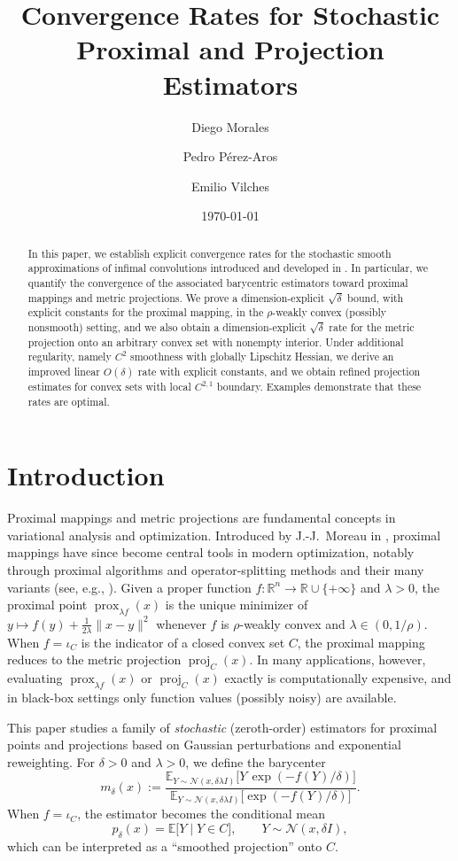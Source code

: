 \documentclass[11pt]{amsart}
\title[Rates for Stochastic Proximal and Projection Estimators]{Convergence Rates for Stochastic Proximal and Projection Estimators}
\author{Diego Morales}
\author{Pedro P\'erez-Aros}
\author{Emilio Vilches}
\date{\today}
\newcommand{\1}{\mathds{1}}
\theoremstyle{definition}
\theoremstyle{remark}
\theoremstyle{definition}
\newcommand{\R}{\mathbb{R}}
\newcommand{\E}{\mathbb{E}}
\newcommand{\proj}{\operatorname{proj}}
\newcommand{\prox}{\operatorname{prox}}
\begin{document}
\begin{abstract}
In this paper, we establish explicit convergence rates for the stochastic smooth approximations of infimal convolutions introduced and developed in \cite{MR4581306,MR4923371}. In particular, we quantify the convergence of the associated barycentric estimators toward proximal mappings and metric projections. We prove a dimension-explicit $\sqrt{\delta}$ bound, with explicit constants for the proximal mapping, in the $\rho$-weakly convex (possibly nonsmooth) setting, and we also obtain a dimension-explicit $\sqrt{\delta}$ rate for the metric projection onto an arbitrary convex set with nonempty interior. Under additional regularity, namely $C^{2}$ smoothness with globally Lipschitz Hessian, we derive an improved linear $O(\delta)$ rate with explicit constants, and we obtain refined projection estimates for convex sets with local $C^{2,1}$ boundary. Examples demonstrate that these rates are optimal.
\end{abstract}

\maketitle

\section{Introduction}

Proximal mappings and metric projections are fundamental concepts in variational analysis and optimization. Introduced by J.-J.~Moreau in \cite{MR201952}, proximal mappings have since become central tools in modern optimization, notably through proximal algorithms and operator-splitting methods and their many variants (see, e.g., \cite{MR3616647}). Given a proper function \(f:\R^n\to\R\cup \{+\infty\}\) and \(\lambda>0\), the proximal point \(\prox_{\lambda f}(x)\) is the unique minimizer
of \(y\mapsto f(y)+\frac{1}{2\lambda}\|x-y\|^2\) whenever \(f\) is \(\rho\)-weakly convex and \(\lambda\in(0,1/\rho)\).
When \(f=\iota_C\) is the indicator of a closed convex set \(C\), the proximal mapping reduces to the metric projection
\(\proj_C(x)\). In many applications, however, evaluating \(\prox_{\lambda f}(x)\) or \(\proj_C(x)\) exactly is computationally
expensive, and in black-box settings only function values (possibly noisy) are available.

This paper studies a family of \emph{stochastic} (zeroth-order) estimators for proximal points and projections based on
Gaussian perturbations and exponential reweighting. For \(\delta>0\) and $\lambda>0$, we define the barycenter
\begin{equation}\label{eq:intro_mdelta}
m_\delta(x)
:=\frac{\E_{Y\sim\mathcal{N}(x,\delta\lambda I)}\!\big[Y\,\exp(-f(Y)/\delta)\big]}
{\E_{Y\sim\mathcal{N}(x,\delta\lambda I)}\!\big[\exp(-f(Y)/\delta)\big]}.
\end{equation}
When \(f=\iota_C\), the estimator becomes the conditional mean
\[
p_\delta(x)=\E\big[Y\mid Y\in C\big],\qquad Y\sim\mathcal{N}(x,\delta I),
\]
which can be interpreted as a ``smoothed projection'' onto \(C\).
\end{document}

